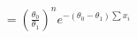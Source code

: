 \documentclass[preview]{standalone}
\begin{document}
\begin{align*}
= \left( \frac{\theta_0}{\theta_1} \right)^n e^{-(\theta_0-\theta_1)\sum x_i}
\end{align*}
\end{document}
